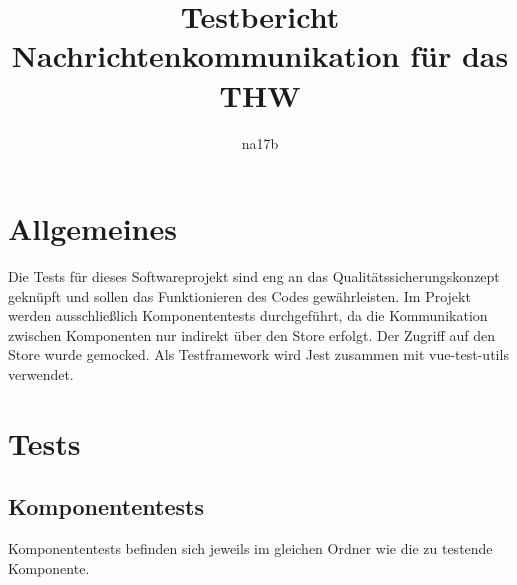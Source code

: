 \documentclass[a4paper,11pt,oneside, titlepage]{article}
\title{Testbericht\\Nachrichtenkommunikation für das THW}
\author{na17b}
\date{}
\begin{document}
\maketitle

\tableofcontents

\newpage

\section{Allgemeines}
Die Tests für dieses Softwareprojekt sind eng an das Qualitätssicherungskonzept geknüpft und sollen das Funktionieren des Codes gewährleisten. Im Projekt werden ausschließlich Komponententests durchgeführt, da die Kommunikation zwischen Komponenten nur indirekt über den Store erfolgt. Der Zugriff auf den Store wurde gemocked. Als Testframework wird \gls{Jest} zusammen mit \gls{vue-test-utils} verwendet.
\section{Tests}
\subsection{Komponententests}
Komponententests befinden sich jeweils im gleichen Ordner wie die zu testende Komponente.
\end{document}

